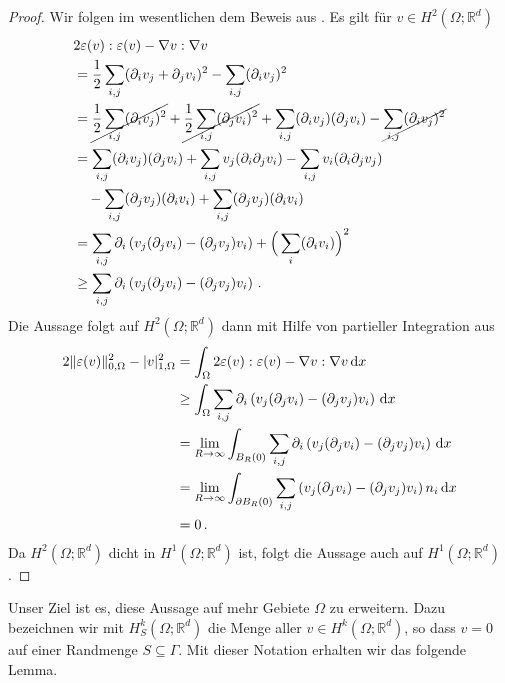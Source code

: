 \documentclass{scrartcl}
\def\R{\mathbb{R}}
\def\e{\varepsilon}
\newcommand{\dif}[1]{\,\mathrm{d} #1}
\DeclarePairedDelimiter{\abs}{\lvert}{\rvert}
\DeclarePairedDelimiter{\norm}{\lVert}{\rVert}
\begin{document}
\begin{proof}
	Wir folgen im wesentlichen dem Beweis aus \cite[S.292]{Bra-2007}. Es gilt für $v\in H^2(\Omega;\R^d)$
	\begin{align*}
		&2\e(v):\e(v)-\nabla v:\nabla v \\
		&= \frac{1}{2}\sum_{i,j}(\partial_iv_j+\partial_jv_i)^2-\sum_{i,j}(\partial_iv_j)^2 \\
		&= \cancel{\frac{1}{2}\sum_{i,j}(\partial_iv_j)^2} +\cancel{\frac{1}{2}\sum_{i,j}(\partial_jv_i)^2} +\sum_{i,j}(\partial_iv_j)(\partial_jv_i) -\cancel{\sum_{i,j}(\partial_iv_j)^2}  \\
		&= \sum_{i,j}(\partial_iv_j)(\partial_jv_i) + \sum_{i,j}v_j(\partial_i\partial_jv_i)-\sum_{i,j}v_i(\partial_i\partial_jv_j) \\
		&\quad-\sum_{i,j}(\partial_jv_j)(\partial_iv_i)+\sum_{i,j}(\partial_jv_j)(\partial_iv_i) \\
		&= \sum_{i,j}\partial_i\left(v_j(\partial_jv_i)-(\partial_jv_j)v_i\right)+\Big(\sum_{i}(\partial_iv_i)\Big)^2 \\
		&\geq \sum_{i,j}\partial_i\left(v_j(\partial_jv_i)-(\partial_jv_j)v_i\right)\,.
	\end{align*}
	Die Aussage folgt auf $H^2(\Omega;\R^d)$ dann mit Hilfe von partieller Integration aus
	\begin{align*}
		2\norm{\e(v)}_{0,\Omega}^2-\abs{v}_{1,\Omega}^2
		&=\int_\Omega 2\e(v):\e(v)-\nabla v:\nabla v\dif x \\
		&\geq\int_\Omega \sum_{i,j}\partial_i\left(v_j(\partial_jv_i)-(\partial_jv_j)v_i\right)\dif x \\
		&= \lim_{R\to\infty}\int_{B_R(0)} \sum_{i,j}\partial_i\left(v_j(\partial_jv_i)-(\partial_jv_j)v_i\right)\dif x \\
		&= \lim_{R\to\infty}\int_{\partial B_R(0)} \sum_{i,j}\left(v_j(\partial_jv_i)-(\partial_jv_j)v_i\right)n_i\dif x \\
		&= 0\,.
	\end{align*}
	Da $H^2(\Omega;\R^d)$ dicht in $H^1(\Omega;\R^d)$ ist, folgt die Aussage auch auf $H^1(\Omega;\R^d)$.
\end{proof}

Unser Ziel ist es, diese Aussage auf mehr Gebiete $\Omega$ zu erweitern.
Dazu bezeichnen wir mit $H^k_S(\Omega;\R^d)$ die Menge aller $v\in H^k(\Omega;\R^d)$, so dass $v=0$ auf einer Randmenge $S\subseteq\Gamma$. Mit dieser Notation erhalten wir das folgende Lemma.
\end{document}
